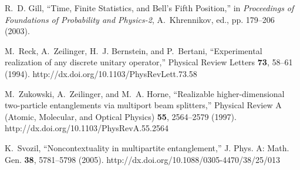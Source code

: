 \documentclass[pra,amsfonts,showpacs,preprint,showkeys]{revtex4}
\begin{document}
\begin{thebibliography}{10}
R.~D. Gill, \enquote{Time, Finite Statistics, and {B}ell's Fifth Position,} in
  {\em Proceedings of Foundations of Probability and Physics-2\/},
  A.~Khrennikov, ed.,  pp. 179--206 (2003).

M.~Reck, A.~Zeilinger, H.~J. Bernstein, and P.~Bertani, \enquote{Experimental
  realization of any discrete unitary operator,} Physical Review Letters {\bf
  73}, 58--61 (1994).
\newline http://dx.doi.org/10.1103/PhysRevLett.73.58

M.~Zukowski, A.~Zeilinger, and M.~A. Horne, \enquote{Realizable
  higher-dimensional two-particle entanglements via multiport beam splitters,}
  Physical Review A (Atomic, Molecular, and Optical Physics) {\bf 55},
  2564--2579 (1997).
\newline http://dx.doi.org/10.1103/PhysRevA.55.2564

K.~Svozil, \enquote{Noncontextuality in multipartite entanglement,} J. Phys. A:
  Math. Gen. {\bf 38}, 5781--5798 (2005).
\newline http://dx.doi.org/10.1088/0305-4470/38/25/013

\end{thebibliography}
\end{document}
